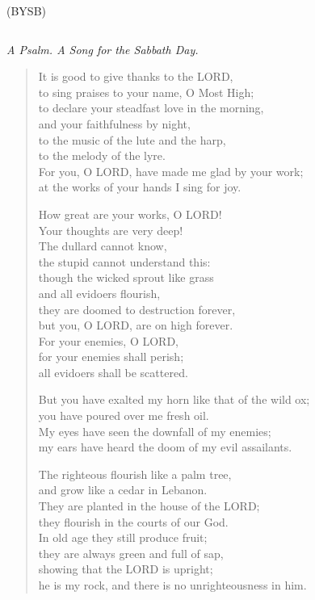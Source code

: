 \documentclass{article}
\begin{document}
\begin{paracol}{2}
\begin{column}
        (BYSB)
    \end{column}
    \begin{column}

        \emph{A Psalm. A Song for the Sabbath Day.}

        \begin{verse}
            It is good to give thanks to the LORD, \\
            to sing praises to your name, O Most High; \\
            to declare your steadfast love in the morning, \\
            and your faithfulness by night, \\
            to the music of the lute and the harp, \\
            to the melody of the lyre. \\
            For you, O LORD, have made me glad by your work; \\
            at the works of your hands I sing for joy.
            
            How great are your works, O LORD! \\
            Your thoughts are very deep! \\
            The dullard cannot know,  \\
            the stupid cannot understand this: \\
            though the wicked sprout like grass \\
            and all evidoers flourish, \\
            they are doomed to destruction forever, \\
            but you, O LORD, are on high forever. \\
            For your enemies, O LORD,  \\
            for your enemies shall perish; \\
            all evidoers shall be scattered.
            
            But you have exalted my horn like that of the wild ox; \\
            you have poured over me fresh oil. \\
            My eyes have seen the downfall of my enemies; \\
            my ears have heard the doom of my evil assailants.

            The righteous flourish like a palm tree, \\
            and grow like a cedar in Lebanon. \\
            They are planted in the house of the LORD; \\
            they flourish in the courts of our God. \\
            In old age they still produce fruit; \\
            they are always green and full of sap, \\
            showing that the LORD is upright; \\
            he is my rock, and there is no unrighteousness in him.
        \end{verse}


\end{column}
\end{paracol}
\end{document}
